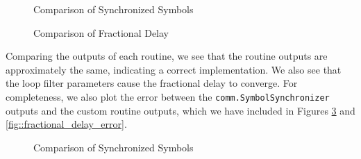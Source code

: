 \documentclass{article}
\begin{document}
\begin{figure}[H]
	\centerline{}
	\caption{Comparison of Synchronized Symbols}
	\label{fig::symbol_sync_no_noise}
\end{figure}

\begin{figure}[H]
	\centerline{}
	\caption{Comparison of Fractional Delay}
	\label{fig::fractional_delay_no_noise}
\end{figure}

\noindent Comparing the outputs of each routine, we see that the routine outputs are approximately the same, indicating a correct implementation. We also see that the loop filter parameters cause the fractional delay to converge. For completeness, we also plot the error between the \texttt{comm.SymbolSynchronizer} outputs and the custom routine outputs, which we have included in Figures \ref{fig::symbol_sync_error} and \ref{fig::fractional_delay_error}.

\begin{figure}[H]
	\centerline{}
	\caption{Comparison of Synchronized Symbols}
	\label{fig::symbol_sync_error}
\end{figure}
\end{document}
